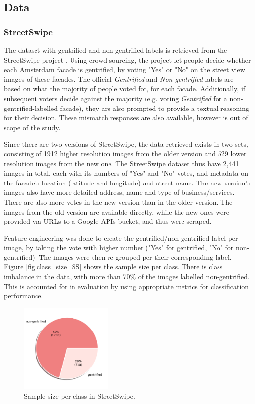 \subsection{Data}
\subsubsection{StreetSwipe}
The dataset with gentrified and non-gentrified labels is retrieved from the StreetSwipe project \cite{streetswipe}. Using crowd-sourcing, the project let people decide whether each Amsterdam facade is gentrified, by voting "Yes" or "No" on the street view images of these facades. The official \textit{Gentrified} and \textit{Non-gentrified} labels are based on what the majority of people voted for, for each facade. Additionally, if subsequent voters decide against the majority (e.g. voting \textit{Gentrified} for a non-gentrified-labelled facade), they are also prompted to provide a textual reasoning for their decision. These mismatch responses are also available, however is out of scope of the study. 

Since there are two versions of StreetSwipe, the data retrieved exists in two sets, consisting of 1912 higher resolution images from the older version and 529 lower resolution images from the new one. The StreetSwipe dataset thus have 2,441 images in total, each with its numbers of "Yes" and "No" votes, and metadata on the facade's location (latitude and longitude) and street name. The new version's images also have more detailed address, name and type of business/services. There are also more votes in the new version than in the older version. The images from the old version are available directly, while the new ones were provided via URLs to a Google APIs bucket, and thus were scraped.

Feature engineering was done to create the gentrified/non-gentrified label per image, by taking the vote with higher number ("Yes" for gentrified, "No" for non-gentrified). The images were then re-grouped per their corresponding label. Figure \ref{fig:class_size_SS} shows the sample size per class. There is class imbalance in the data, with more than 70\% of the images labelled non-gentrified. This is accounted for in evaluation by using appropriate metrics for classification performance.

\begin{figure}[H]
    \centering
    \includegraphics[width=0.4\textwidth]{media/methodology/SS_class_size.png}
    \caption{Sample size per class in StreetSwipe.}
    \label{fig:SS_class_size}
\end{figure}

